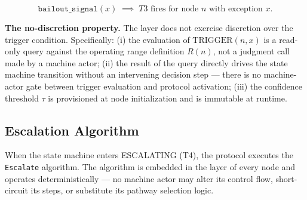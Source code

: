 \begin{equation}
\texttt{bailout\_signal}(x) \; \implies\; T3 \text{ fires for node } n \text{ with exception } x. \tag{TC-secondary}
\end{equation}

\medskip\noindent\textbf{The no-discretion property.} The \bounds{} layer does not exercise discretion over the trigger condition. Specifically: (i) the evaluation of $\text{TRIGGER}(n, x)$ is a read-only query against the operating range definition $R(n)$, not a judgment call made by a machine actor; (ii) the result of the query directly drives the state machine transition without an intervening decision step — there is no machine-actor gate between trigger evaluation and protocol activation; (iii) the confidence threshold $\tau$ is provisioned at node initialization and is immutable at runtime.

\subsection{Escalation Algorithm}\label{sec:escalation-algorithm}

When the state machine enters ESCALATING (T4), the protocol executes the \texttt{Escalate} algorithm. The algorithm is embedded in the \fact{} layer of every node and operates deterministically — no machine actor may alter its control flow, short-circuit its steps, or substitute its pathway selection logic.

